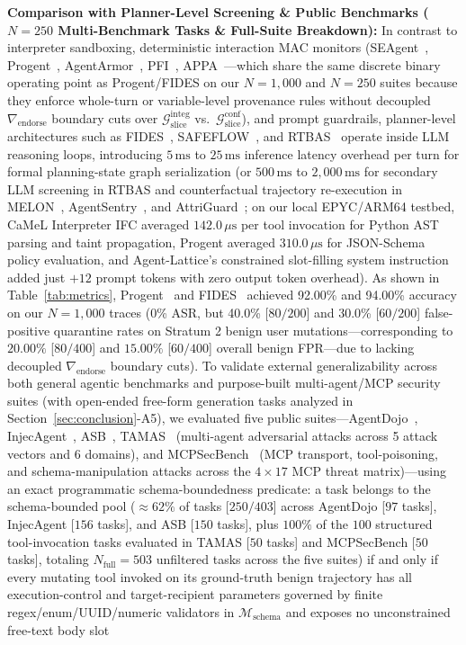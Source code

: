\documentclass[conference,10pt]{IEEEtran}
\begin{document}
\noindent\textbf{Comparison with Planner-Level Screening \& Public Benchmarks ($N = 250$ Multi-Benchmark Tasks \& Full-Suite Breakdown):} In contrast to interpreter sandboxing, deterministic interaction MAC monitors (SEAgent~\cite{ji2026seagent}, Progent~\cite{shi2025progent}, AgentArmor~\cite{wang2025agentarmor}, PFI~\cite{kim2025pfi}, APPA~\cite{kravchenko2026appa}---which share the same discrete binary operating point as Progent/FIDES on our $N=1{,}000$ and $N=250$ suites because they enforce whole-turn or variable-level provenance rules without decoupled $\nabla_{\text{endorse}}$ boundary cuts over $\mathcal{G}_{\text{slice}}^{\text{integ}}$ vs.\ $\mathcal{G}_{\text{slice}}^{\text{conf}}$), and prompt guardrails, planner-level architectures such as FIDES~\cite{costa2025fides}, SAFEFLOW~\cite{li2025safeflow}, and RTBAS~\cite{zhong2025rtbas} operate inside LLM reasoning loops, introducing $5\,\text{ms}$ to $25\,\text{ms}$ inference latency overhead per turn for formal planning-state graph serialization (or $500\,\text{ms}$ to $2{,}000\,\text{ms}$ for secondary LLM screening in RTBAS and counterfactual trajectory re-execution in MELON~\cite{zhu2025melon}, AgentSentry~\cite{zhang2026agentsentry}, and AttriGuard~\cite{he2026attriguard}; on our local EPYC/ARM64 testbed, CaMeL Interpreter IFC averaged $142.0\,\mu\text{s}$ per tool invocation for Python AST parsing and taint propagation, Progent averaged $310.0\,\mu\text{s}$ for JSON-Schema policy evaluation, and Agent-Lattice's constrained slot-filling system instruction added just $+12$ prompt tokens with zero output token overhead). As shown in Table~\ref{tab:metrics}, Progent~\cite{shi2025progent} and FIDES~\cite{costa2025fides} achieved 92.00\% and 94.00\% accuracy on our $N = 1{,}000$ traces (0\% ASR, but 40.0\% [$80/200$] and 30.0\% [$60/200$] false-positive quarantine rates on Stratum 2 benign user mutations---corresponding to $20.00\%$ [$80/400$] and $15.00\%$ [$60/400$] overall benign FPR---due to lacking decoupled $\nabla_{\text{endorse}}$ boundary cuts). To validate external generalizability across both general agentic benchmarks and purpose-built multi-agent/MCP security suites (with open-ended free-form generation tasks analyzed in Section~\ref{sec:conclusion}-A5), we evaluated five public suites---AgentDojo~\cite{agentdojo2024}, InjecAgent~\cite{injecagent2024}, ASB~\cite{zhang2025asb}, TAMAS~\cite{kavathekar2025tamas} (multi-agent adversarial attacks across 5 attack vectors and 6 domains), and MCPSecBench~\cite{yang2025mcpsecbench} (MCP transport, tool-poisoning, and schema-manipulation attacks across the $4 \times 17$ MCP threat matrix)---using an exact programmatic schema-boundedness predicate: a task belongs to the schema-bounded pool ($\approx 62\%$ of tasks [$250/403$] across AgentDojo [$97$ tasks], InjecAgent [$156$ tasks], and ASB [$150$ tasks], plus $100\%$ of the $100$ structured tool-invocation tasks evaluated in TAMAS [$50$ tasks] and MCPSecBench [$50$ tasks], totaling $N_{\text{full}} = 503$ unfiltered tasks across the five suites) if and only if every mutating tool invoked on its ground-truth benign trajectory has all execution-control and target-recipient parameters governed by finite regex/enum/UUID/numeric validators in $\mathcal{M}_{\text{schema}}$ and exposes no unconstrained free-text body slot 
\end{document}

